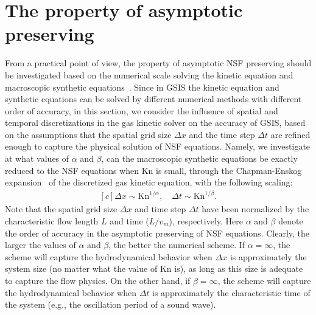 \documentclass[onefignum,onetabnum]{siamart171218}
\begin{document}
\section{The property of asymptotic preserving}\label{section_AP}
    
%    
    
    
From a practical point of view, the property of  asymptotic NSF preserving should be investigated based on the numerical scale solving the kinetic equation and macroscopic synthetic equations~\cite{Guo2019UP_arXiv}. Since in GSIS the kinetic equation and synthetic equations can be solved by different numerical methods with different order of accuracy, in this section, we consider the influence of spatial and temporal discretizations in the gas kinetic solver on the accuracy of GSIS, based on the assumptions that the spatial grid size $\Delta{x}$ and the time step $\Delta{t}$ are refined enough to capture the physical solution of NSF equations. Namely, we investigate at what values of $\alpha$ and $\beta$, can the macroscopic synthetic equations be exactly reduced to the NSF equations when $\text{Kn}$ is small, through the Chapman-Enskog expansion~\cite{CE} of the discretized gas kinetic equation, with the following scaling:
\begin{equation}\label{scaling}
\begin{aligned}[c]
{\Delta{x}}\sim{\text{Kn}^{1/\alpha}},\quad
{\Delta{t}}\sim{\text{Kn}^{1/\beta}}.
\end{aligned}
\end{equation}
Note that the spatial grid size $\Delta{x}$ and time step $\Delta{t}$ have been normalized by the characteristic flow length $L$ and time ($L/v_m$), respectively. 
Here $\alpha$ and $\beta$ denote the order of accuracy in the asymptotic preserving of NSF equations. Clearly, the larger the values of $\alpha$ and $\beta$, the better the numerical scheme. If $\alpha=\infty$, the scheme will capture the hydrodynamical behavior when $\Delta{x}$ is approximately the system size (no matter what the value of $\text{Kn}$ is), as long as this size is adequate to capture the flow physics.  On the other hand, if  $\beta=\infty$, the scheme will capture the hydrodynamical behavior when $\Delta{t}$ is approximately the characteristic time of the system (e.g., the oscillation period of a sound wave).
\end{document}
